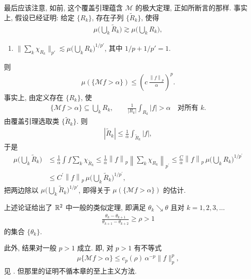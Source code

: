 最后应该注意, 如前, 这个覆盖引理蕴含 $\mathcal{M}$ 的极大定理, 正如所断言的那样. 事实上, 假设已经证明: 给定 $\{R_k\}$, 存在子列 $\{\tilde{R}_k\}$, 使得
\begin{align*}
  \mu\Big(\bigcup_{k}\tilde{R}_{k}\Big)\gtrsim\mu\Big(\bigcup_{k}R_{k}\Big),
\end{align*}
\begin{enumerate}
\item[(2)] $\Big\|\sum_{k}\chi_{R_k}\Big\|_{p'} \lesssim \mu\Big(\bigcup_{k} R_k\Big)^{1/p'}$, 其中 $1/p + 1/p' = 1$.
\end{enumerate}
则
\begin{align*}
  \mu(\{\mathcal{M}f>\alpha\})\leq\left(c\,\frac{\left\|f\right\|_{p}}{\alpha}\right)^{p}.
\end{align*}
事实上, 由定义存在 $\{R_{k}\}$, 使
\begin{align*}
  \{\mathcal{M}f>\alpha\}\subseteq\bigcup_{k}R_{k},\qquad
  \frac{1}{\left|R_{k}\right|}\int_{R_{k}}\left|f\right|>\alpha\quad\text{对所有 } k.
\end{align*}
由覆盖引理选取类 $\{\tilde{R}_{k}\}$. 则
\begin{align*}
  |\tilde{R}_{k}|\leq\frac{1}{\alpha}\int_{\tilde{R}_{k}}|f|,
\end{align*}
于是
\begin{align*}
  \mu\Big(\bigcup_{k}\tilde{R}_{k}\Big)
  &\leq\frac{1}{\alpha}\int f\sum_{k}\chi_{\tilde{R}_{k}}
  \leq\frac{1}{\alpha}\left\|f\right\|_{p}\left\|\sum_{k}\chi_{R_{k}}\right\|_{p^{\prime}}
  \leq\frac{C}{\alpha}\left\|f\right\|_{p}\,\mu\Big(\bigcup_{k}R_{k}\Big)^{1/p^{\prime}}\\
  &\leq C^{\prime}\left\|f\right\|_{p}\,\mu\Big(\bigcup_{k}\tilde{R}_{k}\Big)^{1/p^{\prime}},
\end{align*}
把两边除以 $\mu\bigl(\bigcup_{k}\tilde{R}_{k}\bigr)^{1/p'}$, 即得关于 $\mu(\{\mathcal{M}f > \alpha\})$ 的估计.

上述论证给出了 $\mathbb{R}^2$ 中一般的类似定理, 即满足 $\theta_k \searrow \theta$ 且对 $k = 1, 2, 3, \ldots$
\begin{align*}
  \frac{\theta_k - \theta_{k+1}}{\theta_{k+1} - \theta_{k+2}} \geq \rho > 1
\end{align*}
的集合 $\{\theta_k\}$.

此外, 结果对一般 $p > 1$ 成立. 即, 对 $p > 1$ 有不等式
\begin{align*}
  \mu\{\mathcal{M}f>\alpha\}\leq c_{p}(\rho)\,\alpha^{-p}\|f\|_{p}^{p},
\end{align*}
见 \cite{b50}. 但那里的证明不循本章的至上主义方法.

